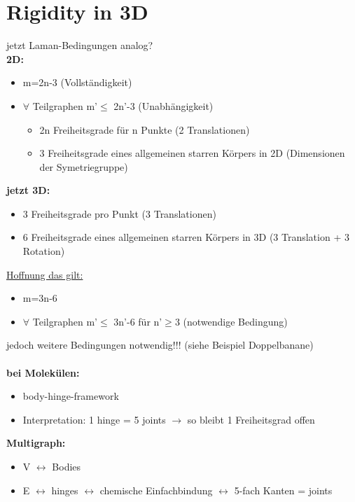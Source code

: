 \documentclass[12pt,a4paper]{article}
\begin{document}
\section{Rigidity in 3D}

jetzt Laman-Bedingungen analog?\\
\textbf{2D:}
\begin{itemize}
	\item m=2n-3 (Vollständigkeit)
	\item $\forall$ Teilgraphen m'$\leq$ 2n'-3 (Unabhängigkeit)
	\begin{itemize}
		\item 2n Freiheitsgrade für n Punkte (2 Translationen)
		\item 3 Freiheitsgrade eines allgemeinen starren Körpers in 2D (Dimensionen der Symetriegruppe)
	\end{itemize}	
\end{itemize}

\textbf{jetzt 3D:}
\begin{itemize}
	\item 3 Freiheitsgrade pro Punkt (3 Translationen)
	\item 6 Freiheitsgrade eines allgemeinen starren Körpers in 3D (3 Translation + 3 Rotation)
\end{itemize}

\underline{Hoffnung das gilt:}
\begin{itemize}
	\item m=3n-6
	\item $\forall$ Teilgraphen m'$\leq$ 3n'-6 für n'$\geq$3 (notwendige Bedingung)
\end{itemize}

jedoch weitere Bedingungen notwendig!!! (siehe Beispiel Doppelbanane)
\\\\
\textbf{bei Molekülen:}
\begin{itemize}
	\item body-hinge-framework
	\item Interpretation: 1 hinge = 5 joints $\rightarrow$ so bleibt 1 Freiheitsgrad offen
\end{itemize}

\parbox{\linewidth}{
\textbf{Multigraph:}
\begin{itemize}
	\item V $\leftrightarrow$ Bodies
	\item E $\leftrightarrow$ hinges $\leftrightarrow$ chemische Einfachbindung $\leftrightarrow$ 5-fach Kanten = joints
\end{itemize}
}
\end{document}
